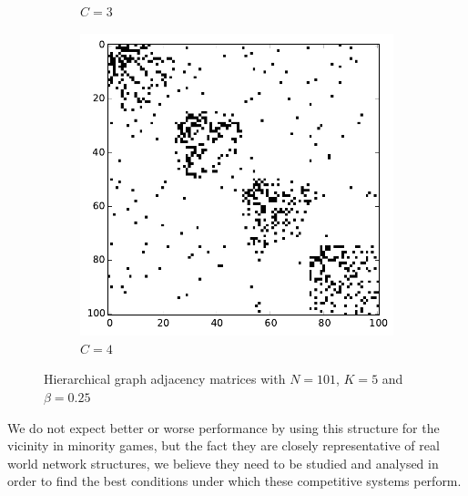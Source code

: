 \begin{figure}[h]
\begin{subfigure}[b]{0.3\textwidth}
                \caption{$C=3$}
        \end{subfigure}
        \begin{subfigure}[b]{0.3\textwidth}
        	\centering
                \includegraphics[width=\textwidth]{images/topology/hierarchical_adjacency_4_dot25.pdf}
                \caption{$C=4$}
        \end{subfigure}
        \caption{Hierarchical graph adjacency matrices with $N=101$, $K=5$ and $\beta =0.25$}
        \label{fig:hierarchical adjacency graph 0.25}
\end{figure}

We do not expect better or worse performance by using this structure for the vicinity in minority games, but the fact they are closely representative of real world network structures, we believe they need to be studied and analysed in order to find the best conditions under which these competitive systems perform.